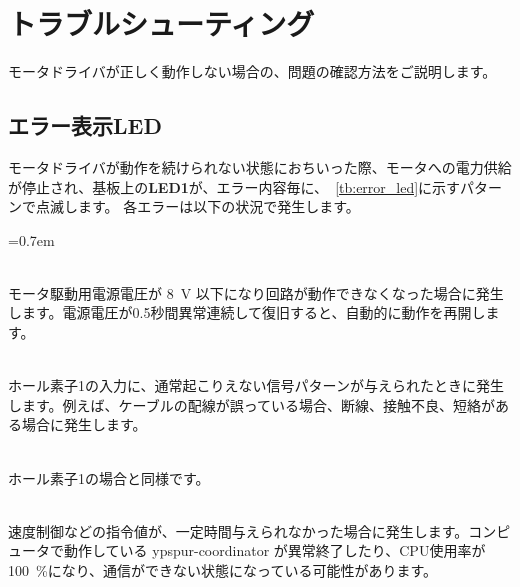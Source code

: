 \documentclass[11pt,a4j,openany,fleqn]{jbook}
\newcommand{\percent}{\%}
\begin{document}
\newpage
\section{トラブルシューティング}
\label{sec:トラブルシューティング}

モータドライバが正しく動作しない場合の、問題の確認方法をご説明します。

\subsection{エラー表示LED}

モータドライバが動作を続けられない状態におちいった際、モータへの電力供給が停止され、基板上の{\bf LED1}が、エラー内容毎に、\tablename~\ref{tb:error_led}に示すパターンで点滅します。
各エラーは以下の状況で発生します。

\begin{description}
\itemsep=0.7em
\item [駆動電圧低下]\mbox{}\\
	モータ駆動用電源電圧が 8~V 以下になり回路が動作できなくなった場合に発生します。電源電圧が0.5秒間異常連続して復旧すると、自動的に動作を再開します。

\item [ホール素子1異常]\mbox{}\\
	ホール素子1の入力に、通常起こりえない信号パターンが与えられたときに発生します。例えば、ケーブルの配線が誤っている場合、断線、接触不良、短絡がある場合に発生します。

\item [ホール素子2異常]\mbox{}\\
	ホール素子1の場合と同様です。

\item [通信なし]\mbox{}\\
	速度制御などの指令値が、一定時間与えられなかった場合に発生します。コンピュータで動作している ypspur-coordinator が異常終了したり、CPU使用率が 100~\percent になり、通信ができない状態になっている可能性があります。

\end{description}
\end{document}
